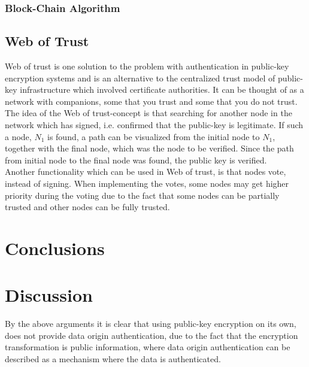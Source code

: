 \documentclass{acm_proc_article-sp}
\begin{document}
\subsubsection{Block-Chain Algorithm}

\subsection{Web of Trust} %
Web of trust is one solution to the problem with authentication in public-key encryption systems and is an alternative to the centralized trust model of public-key infrastructure which involved certificate authorities. It can be thought of as a network with companions, some that you trust and some that you do not trust. %
The idea of the Web of trust-concept is that searching for another node in the network which has signed, i.e. confirmed that the public-key is legitimate. If such a node, $N_1$ is found, a path can be visualized from the initial node to $N_1$, together with the final node, which was the node to be verified. Since the path from initial node to the final node was found, the public key is verified. \\
Another functionality which can be used in Web of trust, is that nodes vote, instead of signing. When implementing the votes, some nodes may get higher priority during the voting due to the fact that some nodes can be partially trusted and other nodes can be fully trusted. \cite{rubin}



\section{Conclusions}

\section{Discussion}
By the above arguments it is clear that using public-key encryption on its own, does not provide data origin authentication, due to the fact that the encryption transformation is public information, where data origin authentication can be described as a mechanism where the data is authenticated. %



%
%
\end{document}
